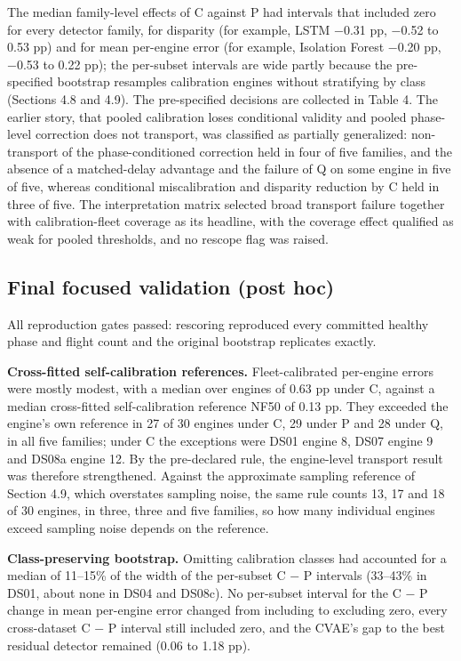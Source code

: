 \documentclass[preprint,11pt,a4paper]{elsarticle}
\begin{document}
The median family-level effects of C against P had intervals that included zero for every detector family, for disparity (for example, LSTM −0.31 pp, −0.52 to 0.53 pp) and for mean per-engine error (for example, Isolation Forest −0.20 pp, −0.53 to 0.22 pp); the per-subset intervals are wide partly because the pre-specified bootstrap resamples calibration engines without stratifying by class (Sections 4.8 and 4.9). The pre-specified decisions are collected in Table 4. The earlier story, that pooled calibration loses conditional validity and pooled phase-level correction does not transport, was classified as partially generalized: non-transport of the phase-conditioned correction held in four of five families, and the absence of a matched-delay advantage and the failure of Q on some engine in five of five, whereas conditional miscalibration and disparity reduction by C held in three of five. The interpretation matrix selected broad transport failure together with calibration-fleet coverage as its headline, with the coverage effect qualified as weak for pooled thresholds, and no rescope flag was raised.

\subsection{Final focused validation (post hoc)}

All reproduction gates passed: rescoring reproduced every committed healthy phase and flight count and the original bootstrap replicates exactly.

\textbf{Cross-fitted self-calibration references.} Fleet-calibrated per-engine errors were mostly modest, with a median over engines of 0.63 pp under C, against a median cross-fitted self-calibration reference NF50 of 0.13 pp. They exceeded the engine's own reference in 27 of 30 engines under C, 29 under P and 28 under Q, in all five families; under C the exceptions were DS01 engine 8, DS07 engine 9 and DS08a engine 12. By the pre-declared rule, the engine-level transport result was therefore strengthened. Against the approximate sampling reference of Section 4.9, which overstates sampling noise, the same rule counts 13, 17 and 18 of 30 engines, in three, three and five families, so how many individual engines exceed sampling noise depends on the reference.

\textbf{Class-preserving bootstrap.} Omitting calibration classes had accounted for a median of 11–15\% of the width of the per-subset C − P intervals (33–43\% in DS01, about none in DS04 and DS08c). No per-subset interval for the C − P change in mean per-engine error changed from including to excluding zero, every cross-dataset C − P interval still included zero, and the CVAE's gap to the best residual detector remained (0.06 to 1.18 pp).
\end{document}
